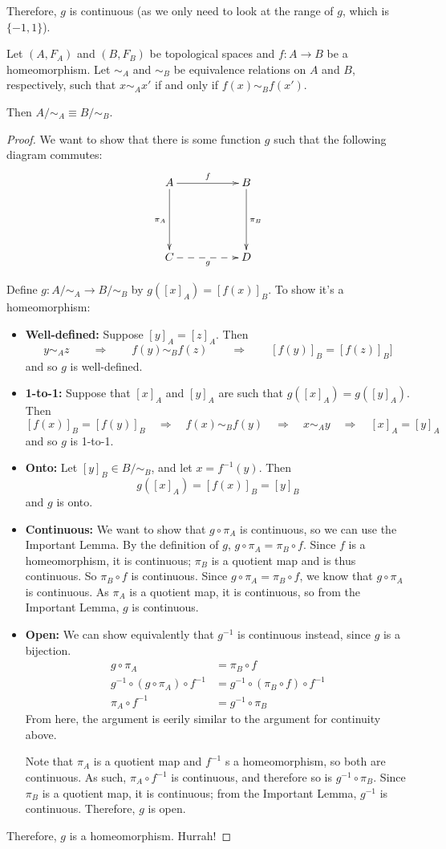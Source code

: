 Therefore, $g$ is continuous (as we only need to look at the range of $g$, which is $\{-1, 1\}$). 
\begin{theorem}
	Let $(A, F_A)$ and $(B, F_B)$ be topological spaces and $f:A\to B$ be a homeomorphism. Let $\sim_A$ and $\sim_B$ be equivalence relations on $A$ and $B$, respectively, such that $x\sim_A x'$ if and only if $f(x) \sim_B f(x')$.
	
	Then $A/\sim_A \equiv B/\sim_B$. 
\end{theorem}
\begin{proof}
	We want to show that there is some function $g$ such that the following diagram commutes:
	\[ \xymatrix{ A \ar[rr]^f \ar[dd]_{\pi_A} && B \ar[dd]^{\pi_B} \\
	&&\\C \ar @{-->}[rr]_g & & D } \]
	
	\item Define $g:A/\sim_A \to B/\sim_B$ by $g\left([x]_A\right) = \left[ f(x) \right]_B$. To show it's a homeomorphism: 
	\begin{itemize}
		\item {\bf Well-defined:} Suppose $[y]_A = [z]_A$. Then
		\[y\sim_A z\qquad\Rightarrow\qquad f(y) \sim_B f(z) \qquad\Rightarrow \qquad[f(y)]_B = [f(z)]_B]\]
		and so $g$ is well-defined. 
		\item {\bf 1-to-1:} Suppose that $[x]_A$ and $[y]_A$ are such that $g([x]_A) = g([y]_A)$. Then
		\[ [f(x)]_B = [f(y)]_B\quad\Rightarrow\quad f(x)\sim_B f(y)\quad\Rightarrow\quad x\sim_A y \quad\Rightarrow\quad [x]_A = [y]_A\]
		and so $g$ is 1-to-1. 
		\item {\bf Onto: } Let $[y]_B\in B/\sim_B$, and let $x = f^{-1}(y)$. Then
		\[ g([x]_A) = [f(x)]_B = [y]_B \]
		and $g$ is onto. 
		\item {\bf Continuous: } We want to show that $g\circ \pi_A$ is continuous, so we can use the Important Lemma. By the definition of $g$, $g\circ \pi_A = \pi_B\circ f$. Since $f$ is a homeomorphism, it is continuous; $\pi_B$ is a quotient map and is thus continuous. So $\pi_B\circ f$ is continuous. Since $g\circ \pi_A = \pi_B\circ f$, we know that $g\circ \pi_A$ is continuous. As $\pi_A$ is a quotient map, it is continuous, so from the Important Lemma, $g$ is continuous. 
		\item {\bf Open: } We can show equivalently that $g^{-1}$ is continuous instead, since $g$ is a bijection. 
		\begin{align*}
			g\circ\pi_A &= \pi_B\circ f \\
			g^{-1}\circ(g\circ\pi_A)\circ f^{-1} &= g^{-1}\circ(\pi_B\circ f)\circ f^{-1} \\
			\pi_A\circ f^{-1} & =g^{-1}\circ \pi_B 
		\end{align*}
		From here, the argument is eerily similar to the argument for continuity above.
		
		Note that $\pi_A$ is a quotient map and $f^{-1}$ s a homeomorphism, so both are continuous. As such, $\pi_A\circ f^{-1}$ is continuous, and therefore so is $g^{-1}\circ \pi_B$. Since $\pi_B$ is a quotient map, it is continuous; from the Important Lemma, $g^{-1}$ is continuous. Therefore, $g$ is open. 
	\end{itemize}
	Therefore, $g$ is a homeomorphism. Hurrah! 
\end{proof}
